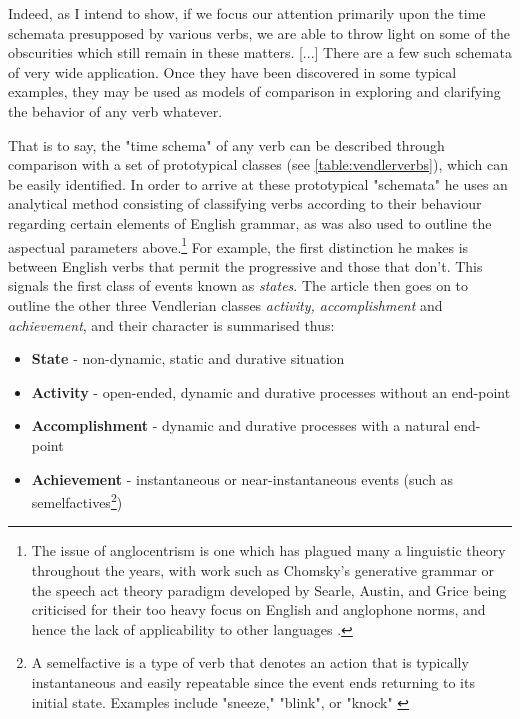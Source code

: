 \begin{displayquote}
    Indeed, as I intend to show, if we focus our attention primarily upon the time schemata presupposed by various verbs, we are able to throw light on some of the obscurities which still remain in these matters. [...] There are a few such schemata of very wide application. Once they have been discovered in some typical examples, they may be used as models of comparison in exploring and clarifying the behavior of any verb whatever.
\end{displayquote}
That is to say, the "time schema" of any verb can be described through comparison with a set of prototypical classes (see \ref{table:vendlerverbs}), which can be easily identified. In order to arrive at these prototypical "schemata" he uses an analytical method consisting of classifying verbs according to their behaviour regarding certain elements of English grammar, as was also used to outline the aspectual parameters above.\footnote{The issue of anglocentrism is one which has plagued many a linguistic theory throughout the years, with work such as Chomsky's generative grammar \citep{chomsky1965aspects} or the speech act theory paradigm developed by Searle, Austin, and Grice \citep{searle1969speech, austin1962how, grice1975logic} being criticised for their too heavy focus on English and anglophone norms, and hence the lack of applicability to other languages \citep{LEVISEN2019101173}.} For example, the first distinction he makes is between English verbs that permit the progressive and those that don't. This signals the first class of events known as \emph{states}. The article then goes on to outline the other three Vendlerian classes \emph{activity, accomplishment} and \emph{achievement}, and their character is summarised thus: 

\begin{itemize}
    \item \textbf{State} - non-dynamic, static and durative situation
    \item \textbf{Activity} - open-ended, dynamic and durative processes without an end-point
    \item \textbf{Accomplishment} - dynamic and durative processes with a natural end-point
    \item \textbf{Achievement} - instantaneous or near-instantaneous events (such as semelfactives\footnote{A semelfactive is a type of verb that denotes an action that is typically instantaneous and easily repeatable since the event ends returning to its initial state. Examples include "sneeze," "blink", or "knock" \citep{Smith1991ThePO, hana_filip_lexasp} })
\end{itemize}

